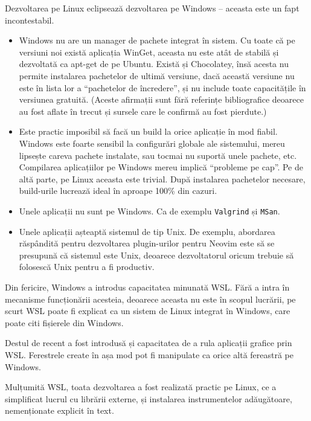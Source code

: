 \documentclass[a4paper,12pt]{report}
\begin{document}
Dezvoltarea pe Linux eclipsează dezvoltarea pe Windows -- aceasta este un fapt incontestabil.
\begin{itemize}
    \item 
        Windows nu are un manager de pachete integrat în sistem.
        Cu toate că pe versiuni noi există aplicația WinGet, 
        aceasta nu este atât de stabilă și dezvoltată ca apt-get de pe Ubuntu.
        Există și Chocolatey, însă acesta nu permite instalarea pachetelor de ultimă versiune,
        dacă această versiune nu este în lista lor a ``pachetelor de încredere'',
        și nu include toate capacitățile în versiunea gratuită.
        (Aceste afirmații sunt fără referințe bibliografice deoarece 
        au fost aflate în trecut și sursele care le confirmă au fost pierdute.)

    \item
        Este practic imposibil să facă un build la orice aplicație în mod fiabil.
        Windows este foarte sensibil la configurări globale ale sistemului,
        mereu lipsește careva pachete instalate, sau tocmai nu suportă unele pachete, etc.
        Compilarea aplicațiilor pe Windows mereu implică ``probleme pe cap''.
        Pe de altă parte, pe Linux aceasta este trivial.
        După instalarea pachetelor necesare, build-urile lucrează ideal în aproape 100\% din cazuri.

    \item
        Unele aplicații nu sunt pe Windows.
        Ca de exemplu \texttt{Valgrind} și \texttt{MSan}.

    \item
        Unele aplicații așteaptă sistemul de tip Unix.
        De exemplu, abordarea răspândită pentru dezvoltarea plugin-urilor
        pentru Neovim este să se presupună că sistemul este Unix,
        deoarece dezvoltatorul oricum trebuie să folosescă Unix pentru a fi productiv.
\end{itemize}

Din fericire, Windows a introdus capacitatea minunată \ac{WSL}.
Fără a intra în mecanisme funcționării acesteia, deoarece aceasta nu este în scopul lucrării,
pe scurt \ac{WSL} poate fi explicat ca un sistem de Linux integrat în Windows, care poate citi fișierele din Windows.

Destul de recent a fost introdusă și capacitatea de a rula aplicații grafice prin \ac{WSL}.
Ferestrele create în așa mod pot fi manipulate ca orice altă fereastră pe Windows.

Mulțumită \ac{WSL}, toata dezvoltarea a fost realizată practic pe Linux, 
ce a simplificat lucrul cu librării externe, și instalarea instrumentelor adăugătoare, nemenționate explicit în text.
\end{document}
